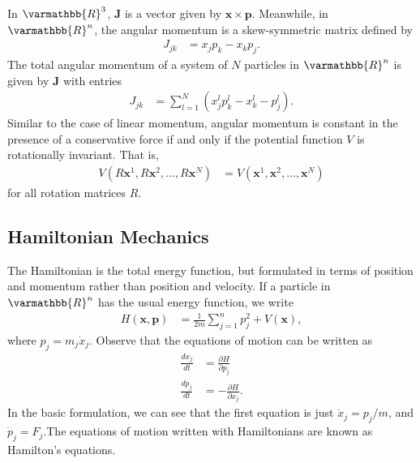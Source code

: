 \documentclass[12pt]{extarticle}
\newcommand{\R}{\varmathbb{R}}
\theoremstyle{plain}
\theoremstyle{definition}
\theoremstyle{remark}
\begin{document}
  In $\R^3$, $\mathbf{J}$ is a vector given by $\mathbf{x}\times \mathbf{p}$. Meanwhile, in $\R^n$, the angular momentum is a skew-symmetric matrix defined by
  \begin{align*}
    J_{jk} &= x_{j}p_k - x_kp_j.
  \end{align*}
  The total angular momentum of a system of $N$ particles in $\R^n$ is given by $\mathbf{J}$ with entries
  \begin{align*}
    J_{jk} &= \sum_{l=1}^{N}\left(x_{j}^lp_{k}^l - x_{k}^l - p_{j}^l\right).
  \end{align*}
  Similar to the case of linear momentum, angular momentum is constant in the presence of a conservative force if and only if the potential function $V$ is rotationally invariant. That is,
  \begin{align*}
    V(R\mathbf{x}^1,R\mathbf{x}^2,\dots,R\mathbf{x}^N) &= V(\mathbf{x}^1,\mathbf{x}^2,\dots,\mathbf{x}^N)
  \end{align*}
  for all rotation matrices $R$.
  \subsection{Hamiltonian Mechanics}%
  The Hamiltonian is the total energy function, but formulated in terms of position and momentum rather than position and velocity. If a particle in $\R^n$ has the usual energy function, we write
  \begin{align*}
    H(\mathbf{x},\mathbf{p}) &= \frac{1}{2m}\sum_{j=1}^{n}p_j^2 + V(\mathbf{x}),
  \end{align*}
  where $p_j = m_j\dot{x}_j$. Observe that the equations of motion can be written as
  \begin{align*}
    \frac{dx_j}{dt} &= \frac{\partial H}{\partial p_j}\\
    \frac{dp_j}{dt} &= -\frac{\partial H}{\partial x_j}.
  \end{align*}
  In the basic formulation, we can see that the first equation is just $\dot{x}_j = p_j/m$, and $\dot{p}_j = F_j$.The equations of motion written with Hamiltonians are known as Hamilton's equations.
\end{document}
